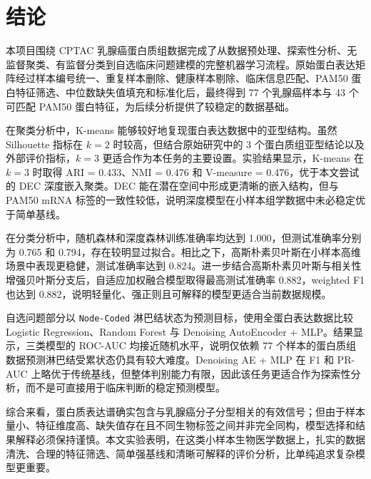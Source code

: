 \section{结论}
\label{sec:conclusion}

本项目围绕 CPTAC 乳腺癌蛋白质组数据完成了从数据预处理、探索性分析、无监督聚类、有监督分类到自选临床问题建模的完整机器学习流程。原始蛋白表达矩阵经过样本编号统一、重复样本删除、健康样本剔除、临床信息匹配、PAM50 蛋白特征筛选、中位数缺失值填充和标准化后，最终得到 77 个乳腺癌样本与 43 个可匹配 PAM50 蛋白特征，为后续分析提供了较稳定的数据基础。

在聚类分析中，K-means 能够较好地复现蛋白表达数据中的亚型结构。虽然 Silhouette 指标在 \(k=2\) 时较高，但结合原始研究中的 3 个蛋白质组亚型结论以及外部评价指标，\(k=3\) 更适合作为本任务的主要设置。实验结果显示，K-means 在 \(k=3\) 时取得 ARI = 0.433、NMI = 0.476 和 V-measure = 0.476，优于本文尝试的 DEC 深度嵌入聚类。DEC 能在潜在空间中形成更清晰的嵌入结构，但与 PAM50 mRNA 标签的一致性较低，说明深度模型在小样本组学数据中未必稳定优于简单基线。

在分类分析中，随机森林和深度森林训练准确率均达到 1.000，但测试准确率分别为 0.765 和 0.794，存在较明显过拟合。相比之下，高斯朴素贝叶斯在小样本高维场景中表现更稳健，测试准确率达到 0.824。进一步结合高斯朴素贝叶斯与相关性增强贝叶斯分支后，自适应加权融合模型取得最高测试准确率 0.882，weighted F1 也达到 0.882，说明轻量化、强正则且可解释的模型更适合当前数据规模。

自选问题部分以 \texttt{Node-Coded} 淋巴结状态为预测目标，使用全蛋白表达数据比较 Logistic Regression、Random Forest 与 Denoising AutoEncoder + MLP。结果显示，三类模型的 ROC-AUC 均接近随机水平，说明仅依赖 77 个样本的蛋白质组数据预测淋巴结受累状态仍具有较大难度。Denoising AE + MLP 在 F1 和 PR-AUC 上略优于传统基线，但整体判别能力有限，因此该任务更适合作为探索性分析，而不是可直接用于临床判断的稳定预测模型。

综合来看，蛋白质表达谱确实包含与乳腺癌分子分型相关的有效信号；但由于样本量小、特征维度高、缺失值存在且不同生物标签之间并非完全同构，模型选择和结果解释必须保持谨慎。本文实验表明，在这类小样本生物医学数据上，扎实的数据清洗、合理的特征筛选、简单强基线和清晰可解释的评价分析，比单纯追求复杂模型更重要。
